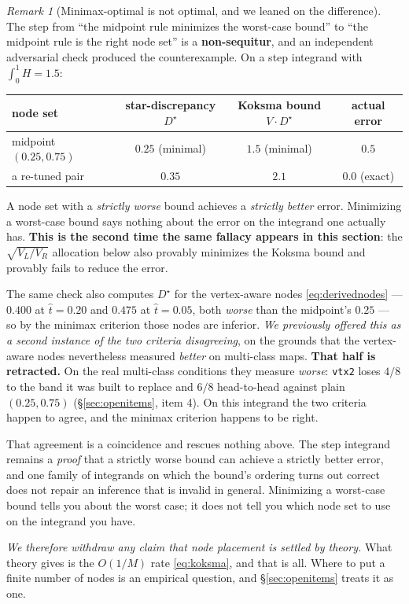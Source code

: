 \documentclass[11pt]{article}
\theoremstyle{remark}
\newtheorem{remark}{Remark}
\begin{document}
\begin{remark}[Minimax-optimal is not optimal, and we leaned on the difference]\label{rem:minimaxfallacy}
The step from ``the midpoint rule minimizes the worst-case bound'' to ``the midpoint
rule is the right node set'' is a \textbf{non-sequitur}, and an independent adversarial
check produced the counterexample. On a step integrand with $\int_0^1 H = 1.5$:

\begin{center}
\small
\begin{tabular}{lccc}
\toprule
node set & star-discrepancy $D^\star$ & Koksma bound $V\!\cdot\!D^\star$ & \textbf{actual error} \\
\midrule
midpoint $(0.25, 0.75)$ & $\mathbf{0.25}$ (minimal) & $\mathbf{1.5}$ (minimal) & $0.5$ \\
a re-tuned pair         & $0.35$ & $2.1$ & $\mathbf{0.0}$ (exact) \\
\bottomrule
\end{tabular}
\end{center}

A node set with a \emph{strictly worse} bound achieves a \emph{strictly better} error.
Minimizing a worst-case bound says nothing about the error on the integrand one
actually has. \textbf{This is the second time the same fallacy appears in this
section}: the $\sqrt{V_L/V_R}$ allocation below also provably minimizes the Koksma
bound and provably fails to reduce the error.

The same check also computes $D^\star$ for the vertex-aware nodes
\eqref{eq:derivednodes} --- $0.400$ at $\hat t = 0.20$ and $0.475$ at $\hat t = 0.05$,
both \emph{worse} than the midpoint's $0.25$ --- so by the minimax criterion those nodes
are inferior. \emph{We previously offered this as a second instance of the two criteria
disagreeing}, on the grounds that the vertex-aware nodes nevertheless measured
\emph{better} on multi-class maps. \textbf{That half is retracted.} On the real
multi-class conditions they measure \emph{worse}: \texttt{vtx2} loses $4/8$ to the band
it was built to replace and $6/8$ head-to-head against plain $(0.25,0.75)$
(\S\ref{sec:openitems}, item 4). On this integrand the two criteria happen to agree, and
the minimax criterion happens to be right.

That agreement is a coincidence and rescues nothing above. The step integrand remains a
\emph{proof} that a strictly worse bound can achieve a strictly better error, and one
family of integrands on which the bound's ordering turns out correct does not repair an
inference that is invalid in general. Minimizing a worst-case bound tells you about the
worst case; it does not tell you which node set to use on the integrand you have.

\emph{We therefore withdraw any claim that node placement is settled by theory.} What
theory gives is the $O(1/M)$ rate \eqref{eq:koksma}, and that is all. Where to put a
finite number of nodes is an empirical question, and \S\ref{sec:openitems} treats it as
one.
\end{remark}
\end{document}
